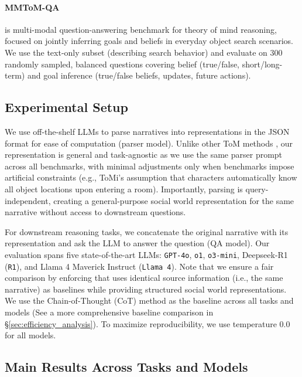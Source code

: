 \paragraph{MMToM-QA}  is multi-modal question-answering benchmark for theory of mind reasoning, focused on jointly inferring goals and beliefs in everyday object search scenarios. We use the text-only subset (describing search behavior) and evaluate on 300 randomly sampled, balanced questions covering belief (true/false, short/long-term) and goal inference (true/false beliefs, updates, future actions).





\subsection{Experimental Setup}
\label{sec:experimental_setup}
We use off-the-shelf LLMs to parse narratives into \protocolname representations in the JSON format for ease of computation (parser model). Unlike other ToM methods \citep{sclar2023mindinglanguagemodelslack}, our representation is general and task-agnostic as we use the same parser prompt across all benchmarks, with minimal adjustments only when benchmarks impose artificial constraints (e.g., ToMi's assumption that characters automatically know all object locations upon entering a room). Importantly, \protocolname parsing is query-independent, creating a general-purpose social world representation for the same narrative without access to downstream questions.

For downstream reasoning tasks, we concatenate the original narrative with its \protocolname representation and ask the LLM to answer the question (QA model).
Our evaluation spans five state-of-the-art LLMs: \texttt{GPT-4o}, \texttt{o1}, \texttt{o3-mini}, Deepseek-R1 (\texttt{R1}), and Llama 4 Maverick Instruct (\texttt{Llama 4}).
Note that we ensure a fair comparison by enforcing that \protocolname uses identical source information (i.e., the same narrative) as baselines while providing structured social world representations.
We use the Chain-of-Thought (CoT) method as the baseline across all tasks and models (See a more comprehensive baseline comparison in \S \ref{sec:efficiency_analysis}).
To maximize reproducibility, we use temperature 0.0 for all models.

\subsection{Main Results Across Tasks and Models}
\label{sec:omniscient_social_reasoning}


